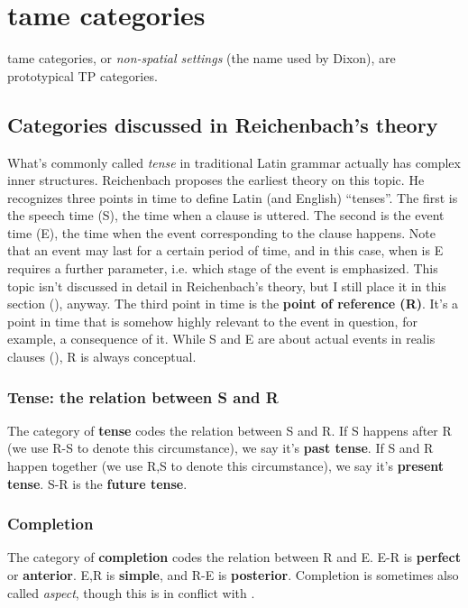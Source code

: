 \documentclass[UTF8, a4paper, oneside, scheme=plain]{ctexart}
\newcommand*{\concept}[1]{\textbf{#1}}
\newcommand*{\term}[1]{\emph{#1}}
\begin{document}
\section{\ac{tame} categories}

\ac{tame} categories, or \term{non-spatial settings} (the name used by Dixon),
are prototypical TP categories.

\subsection{Categories discussed in Reichenbach's theory}

What's commonly called \term{tense} in traditional Latin grammar actually has complex inner structures.
Reichenbach proposes the earliest theory on this topic.
He recognizes three points in time to define Latin (and English) ``tenses''.
The first is the speech time (S), 
the time when a clause is uttered.
The second is the event time (E),
the time when the event corresponding to the clause happens.
Note that an event may last for a certain period of time,
and in this case, 
when is E requires a further parameter,
i.e. which stage of the event is emphasized.
This topic isn't discussed in detail in Reichenbach's theory,
but I still place it in this section (), anyway.
The third point in time is the \concept{point of reference (R)}.
It's a point in time that is somehow highly relevant to the event in question,
for example, a consequence of it.
While S and E are about actual events in realis clauses (),
R is always conceptual.

\subsubsection{Tense: the relation between S and R}

The category of \concept{tense} codes the relation between S and R.
If S happens after R (we use R-S to denote this circumstance),
we say it's \concept{past tense}.
If S and R happen together (we use R,S to denote this circumstance),
we say it's \concept{present tense}.
S-R is the \concept{future tense}.

\subsubsection{Completion}\label{sec:completion}

The category of \concept{completion} codes the relation between R and E.
E-R is \concept{perfect} or \concept{anterior}.
E,R is \concept{simple},
and R-E is \concept{posterior}.
Completion is sometimes also called \term{aspect},
though this is in conflict with .
\end{document}
